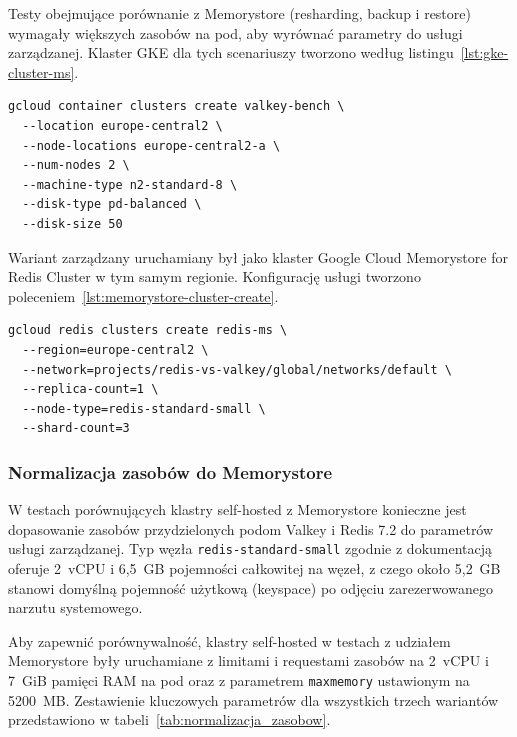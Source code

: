 Testy obejmujące porównanie z Memorystore (resharding, backup i restore) wymagały większych zasobów na pod, aby wyrównać parametry do usługi zarządzanej. Klaster GKE dla tych scenariuszy tworzono według listingu~\ref{lst:gke-cluster-ms}.

\begin{lstlisting}[basicstyle=\ttfamily\footnotesize,columns=fullflexible,keepspaces=true,breaklines=true,breakatwhitespace=true,frame=single,framerule=0.2pt,caption={Klaster GKE dla testów z Memorystore},label={lst:gke-cluster-ms}]
gcloud container clusters create valkey-bench \
  --location europe-central2 \
  --node-locations europe-central2-a \
  --num-nodes 2 \
  --machine-type n2-standard-8 \
  --disk-type pd-balanced \
  --disk-size 50
\end{lstlisting}

Wariant zarządzany uruchamiany był jako klaster Google Cloud Memorystore for Redis Cluster w tym samym regionie. Konfigurację usługi tworzono poleceniem~\ref{lst:memorystore-cluster-create}.

\begin{lstlisting}[basicstyle=\ttfamily\footnotesize,columns=fullflexible,keepspaces=true,breaklines=true,breakatwhitespace=true,frame=single,framerule=0.2pt,caption={Utworzenie klastra Memorystore},label={lst:memorystore-cluster-create}]
gcloud redis clusters create redis-ms \
  --region=europe-central2 \
  --network=projects/redis-vs-valkey/global/networks/default \
  --replica-count=1 \
  --node-type=redis-standard-small \
  --shard-count=3
\end{lstlisting}

\subsubsection{Normalizacja zasobów do Memorystore}\label{subsec:normalizacja}

W testach porównujących klastry self-hosted z Memorystore konieczne jest dopasowanie zasobów przydzielonych podom Valkey i Redis 7.2 do parametrów usługi zarządzanej. Typ węzła \texttt{redis-standard-small} zgodnie z dokumentacją~\cite{gcpMemorystoreNodeTypes} oferuje 2~vCPU i 6{,}5~GB pojemności całkowitej na węzeł, z czego około 5{,}2~GB stanowi domyślną pojemność użytkową (keyspace) po odjęciu zarezerwowanego narzutu systemowego.

Aby zapewnić porównywalność, klastry self-hosted w testach z udziałem Memorystore były uruchamiane z limitami i requestami zasobów na 2~vCPU i 7~GiB pamięci RAM na pod oraz z parametrem \texttt{maxmemory} ustawionym na 5200~MB. Zestawienie kluczowych parametrów dla wszystkich trzech wariantów przedstawiono w tabeli~\ref{tab:normalizacja_zasobow}.

